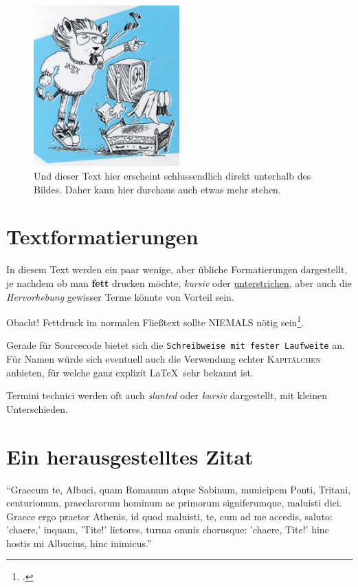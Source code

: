 \begin{figure}[!t]
	\centering
			\includegraphics[width=0.5\textwidth]{misc/latex.jpg} 		%
	   	  \caption[\LaTeX~Logo] %
	   	  				{Und dieser Text hier erscheint schlussendlich direkt unterhalb des Bildes. Daher kann hier durchaus auch etwas mehr stehen.}
  			\label{fig:texlogo}
\end{figure}






\section{Textformatierungen}

In diesem Text werden ein paar wenige, aber übliche Formatierungen dargestellt,
je nachdem ob man \textbf{fett} drucken möchte, \textit{kursiv} oder \underline{unterstrichen}, aber auch die \emph{Hervorhebung}
gewisser Terme könnte von Vorteil sein.

Obacht! Fettdruck im normalen Fließtext sollte NIEMALS nötig sein\footcite[S.112]{Jarz2008}.

Gerade für Sourcecode bietet sich die \texttt{Schreibweise mit fester Laufweite} an. Für Namen würde sich eventuell auch
die Verwendung echter \textsc{Kapitälchen} anbieten, für welche ganz explizit \LaTeX~sehr bekannt ist.

Termini technici werden oft auch \textsl{slanted} oder \textit{kursiv} dargestellt, mit kleinen Unterschieden.

\section{Ein herausgestelltes Zitat}
\begin{zitat}
		"`Graecum te, Albuci, quam Romanum atque Sabinum,
		municipem Ponti, Tritani, centurionum,
		praeclarorum hominum ac primorum signiferumque,
		maluisti dici. Graece ergo praetor Athenis,
		id quod maluisti, te, cum ad me accedis, saluto:
		'chaere,' inquam, 'Tite!' lictores, turma omnis chorusque:
		'chaere, Tite!' hinc hostis mi Albucius, hinc inimicus."'
\end{zitat}





